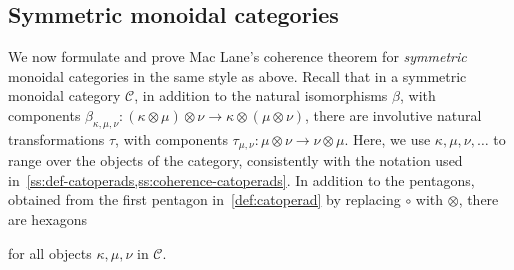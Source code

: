 


\subsection{Symmetric monoidal categories} 

We now formulate and prove Mac Lane's coherence theorem for \emph{symmetric} monoidal categories in the same style as above.  Recall that in a symmetric monoidal category $\mathcal{C}$, in addition to the natural isomorphisms $\beta$, with components $\beta_{\kappa,\mu,\nu}:(\kappa\otimes\mu)\otimes\nu\to
\kappa\otimes(\mu\otimes\nu)$, there are involutive natural transformations $\tau$, with components $\tau_{\mu,\nu}:\mu\otimes\nu\to\nu\otimes\mu$.
Here, we use $\kappa,\mu,\nu,\ldots$ to range over the objects of the category, consistently with the notation used in~\cref{ss:def-catoperads,ss:coherence-catoperads}.
In addition to the pentagons, obtained from the first pentagon in~\cref{def:catoperad} by replacing $\circ$ with $\otimes$, there are hexagons 
\begin{center}
\end{center}
for all objects $\kappa,\mu,\nu$ in $\mathcal{C}$.


